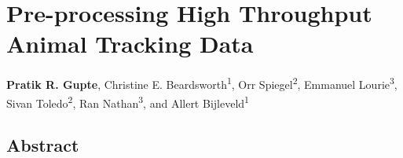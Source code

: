 \chapter{Pre-processing High Throughput Animal Tracking Data}\label{ch:preprocessing}
% 
\noindent \textbf{Pratik R. Gupte}, Christine E. Beardsworth\textsuperscript{1}, Orr Spiegel\textsuperscript{2}, Emmanuel Lourie\textsuperscript{3}, Sivan Toledo\textsuperscript{2}, Ran Nathan\textsuperscript{3}, and Allert Bijleveld\textsuperscript{1}


\section*{Abstract}

